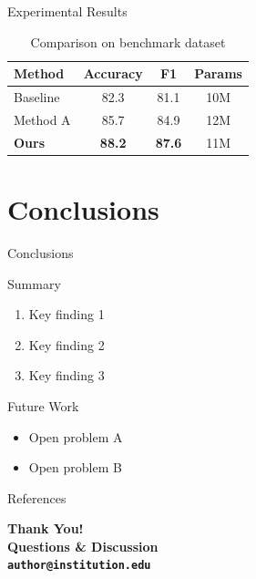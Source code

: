 \documentclass[aspectratio=169,12pt]{beamer}
\begin{document}
\begin{frame}{Experimental Results}
  \begin{table}
    \centering
    \caption{Comparison on benchmark dataset}
    \begin{tabular}{lccc}
      \toprule
      \textbf{Method} & \textbf{Accuracy} & \textbf{F1} & \textbf{Params} \\
      \midrule
      Baseline        & 82.3              & 81.1        & 10M \\
      Method A        & 85.7              & 84.9        & 12M \\
      \textbf{Ours}   & \textbf{88.2}     & \textbf{87.6} & 11M \\
      \bottomrule
    \end{tabular}
  \end{table}
\end{frame}

\section{Conclusions}

\begin{frame}{Conclusions}
  \begin{block}{Summary}
    \begin{enumerate}
      \item Key finding 1
      \item Key finding 2
      \item Key finding 3
    \end{enumerate}
  \end{block}
  \vfill
  \begin{alertblock}{Future Work}
    \begin{itemize}
      \item Open problem A
      \item Open problem B
    \end{itemize}
  \end{alertblock}
\end{frame}

\begin{frame}[allowframebreaks]{References}
  
  
\end{frame}

\begin{frame}
  \centering
  \Huge\bfseries\color{mlblue} Thank You!\\[1em]
  \normalsize Questions \& Discussion\\[2em]
  \small \texttt{author@institution.edu}
\end{frame}
\end{document}
